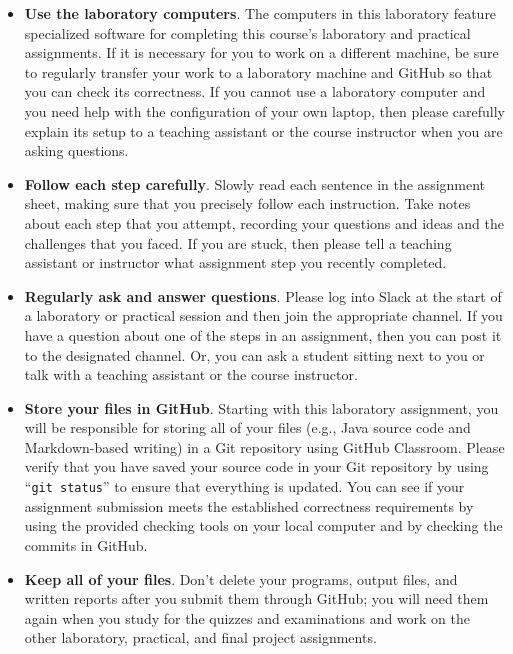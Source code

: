 \documentclass[11pt]{article}
\newcommand{\command}[1]{``\lstinline{#1}''}
\begin{document}
\begin{itemize}
  \setlength{\itemsep}{0pt}

\item {\bf Use the laboratory computers}. The computers in this laboratory
  feature specialized software for completing this course's laboratory and
  practical assignments. If it is necessary for you to work on a different
  machine, be sure to regularly transfer your work to a laboratory machine and
  GitHub so that you can check its correctness. If you cannot use a laboratory
  computer and you need help with the configuration of your own laptop, then
  please carefully explain its setup to a teaching assistant or the course
  instructor when you are asking questions.

\item {\bf Follow each step carefully}. Slowly read each sentence in the
  assignment sheet, making sure that you precisely follow each instruction.
  Take notes about each step that you attempt, recording your questions and
  ideas and the challenges that you faced. If you are stuck, then please tell a
  teaching assistant or instructor what assignment step you recently completed.

\item {\bf Regularly ask and answer questions}. Please log into Slack at the
  start of a laboratory or practical session and then join the appropriate
  channel. If you have a question about one of the steps in an assignment, then
  you can post it to the designated channel. Or, you can ask a student sitting
  next to you or talk with a teaching assistant or the course instructor.

\item {\bf Store your files in GitHub}. Starting with this laboratory
  assignment, you will be responsible for storing all of your files (e.g., Java
  source code and Markdown-based writing) in a Git repository using GitHub
  Classroom. Please verify that you have saved your source code in your Git
  repository by using \command{git status} to ensure that everything is
  updated. You can see if your assignment submission meets the established
  correctness requirements by using the provided checking tools on your local
  computer and by checking the commits in GitHub.

\item {\bf Keep all of your files}. Don't delete your programs, output files,
  and written reports after you submit them through GitHub; you will need them
  again when you study for the quizzes and examinations and work on the other
  laboratory, practical, and final project assignments.


\end{itemize}
\end{document}
